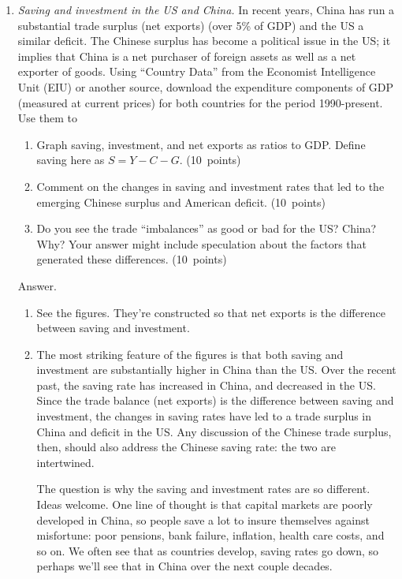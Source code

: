 \documentclass[letterpaper,12pt]{article}
\begin{document}
\begin{enumerate}
\item {\it Saving and investment in the US and China.}  
In recent years, China has run a substantial trade surplus (net exports) 
(over 5\% of GDP) and the US a similar deficit.  
The Chinese surplus has become a political issue in the US;
it implies that China is a net purchaser of foreign assets
as well as a net exporter of goods.    
Using ``Country Data'' from the Economist Intelligence Unit (EIU)
or another source, 
download the expenditure components of GDP (measured at current prices) 
for both countries for the period 1990-present.  Use them to
%
\begin{enumerate}
\item Graph saving, investment, and net exports as ratios to GDP.  
Define saving here as $S = Y - C - G $. 
(10~points) 

\item Comment on the changes in saving and investment rates 
that led to the emerging Chinese surplus and American deficit.  
(10~points) 

\item 
Do you see the trade ``imbalances'' as good or bad for the US?  
China?  Why?  
Your answer might include speculation 
about the factors that generated these differences.  
(10~points) 
\end{enumerate}


Answer.  

\begin{enumerate}
\item See the figures.  They're constructed so that net exports
is the difference between saving and investment.  

\item The most striking feature of the figures is that 
both saving and investment are substantially higher 
in China than the US.
Over the recent past, the saving rate has increased in China, 
and decreased in the US.
Since the trade balance (net exports) is the difference 
between saving and investment, 
the changes in saving rates have led to 
a trade surplus in China and deficit in the US.
Any discussion of the Chinese trade surplus, 
then, should also address the 
Chinese saving rate:  the two are intertwined.  

The question is why the saving and investment rates are so 
different.  
Ideas welcome.
One line of thought is that capital markets are poorly developed
in China, so people save a lot to insure themselves against
misfortune:  poor pensions, bank failure, inflation, 
health care costs, and so on.  
We often see that as countries develop, saving rates go down, 
so perhaps we'll see that in China over the next couple 
decades.  
  

\end{enumerate}
\end{enumerate}
\end{document}
